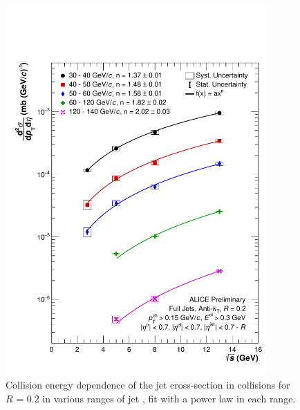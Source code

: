 \begin{figure}[]
    \centering
    \includegraphics[width=10cm]{figures/EnergyComparisons/sqrtSComp_R02.pdf}
    \caption{Collision energy dependence of the jet cross-section in \pp collisions for $R$ = 0.2 in various ranges of jet \pT, fit with a power law in each \pT range.}
    \label{fig:appSqrtSCompareR02}
\end{figure}

